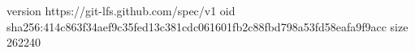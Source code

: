 version https://git-lfs.github.com/spec/v1
oid sha256:414c863f34aef9c35fed13c381cdc061601fb2c88fbd798a53fd58eafa9f9acc
size 262240
